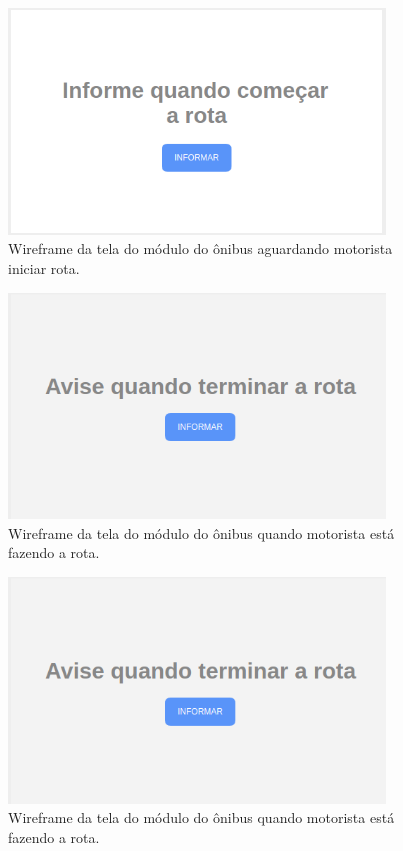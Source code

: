 \documentclass[
	12pt,				%
	oneside,			%
	a4paper,			%
	brazil				%
]{abntex2}
\begin{document}
\begin{apendicesenv}
\begin{figure}[!h]
\centering
\includegraphics[width=10cm, center]{images/busmodule-comecar-rota}
\caption{Wireframe da tela do módulo do ônibus aguardando motorista iniciar rota.}
\label{Rotulo}
\end{figure}

\begin{figure}[!h]
\centering
\includegraphics[width=10cm, center]{images/busmodule-finish-route}
\caption{Wireframe da tela do módulo do ônibus quando motorista está fazendo a rota.}
\label{Rotulo}
\end{figure}

\begin{figure}[!h]
\centering
\includegraphics[width=10cm, center]{images/busmodule-finish-route}
\caption{Wireframe da tela do módulo do ônibus quando motorista está fazendo a rota.}
\label{Rotulo}
\end{figure}


\end{apendicesenv}
\end{document}
